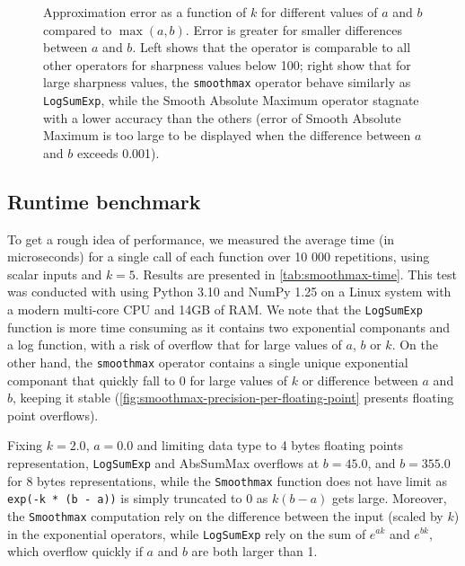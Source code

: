\begin{figure}
    \caption{Approximation error as a function of $k$ for different values of $a$ and $b$ compared to $\max(a, b)$. Error is greater for smaller differences between $a$ and $b$. Left shows that the operator is comparable to all other operators for sharpness values below 100; right show that for large sharpness values, the \texttt{smoothmax} operator behave similarly as \texttt{LogSumExp}, while the Smooth Absolute Maximum operator stagnate with a lower accuracy than the others (error of Smooth Absolute Maximum is too large to be displayed when the difference between $a$ and $b$ exceeds 0.001). }
    \label{fig:smoothmax-sharpness}
\end{figure}

\subsection*{Runtime benchmark}

To get a rough idea of performance, we measured the average time (in microseconds) for a single call of each function over 10 000 repetitions, using scalar inputs and $k = 5$. Results are presented in \cref{tab:smoothmax-time}. This test was conducted with using Python 3.10 and NumPy 1.25 on a Linux system with a modern multi-core CPU and 14GB of RAM. We note that the \texttt{LogSumExp} function is more time consuming as it contains two exponential componants and a log function, with a risk of overflow that for large values of $a$, $b$ or $k$. On the other hand, the \texttt{smoothmax} operator contains a single unique exponential componant that quickly fall to 0 for large values of $k$ or difference between $a$ and $b$, keeping it stable (\cref{fig:smoothmax-precision-per-floating-point} presents floating point overflows). 

Fixing $k = 2.0$, $a = 0.0$ and limiting data type to 4 bytes floating points representation, \texttt{LogSumExp} and AbsSumMax overflows at $b = 45.0$, and $b = 355.0$ for 8 bytes representations, while the \texttt{Smoothmax} function does not have limit as \texttt{exp(-k * (b - a))} is simply truncated to 0 as $k (b - a)$ gets large. Moreover, the \texttt{Smoothmax} computation rely on the difference between the input (scaled by $k$) in the exponential operators, while \texttt{LogSumExp} rely on the sum of $e^{ak}$ and $e^{bk}$, which overflow quickly if $a$ and $b$ are both larger than 1.

